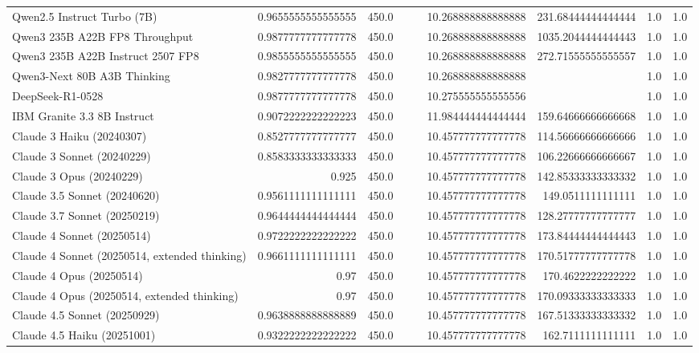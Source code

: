 \begin{table}[htp]
{\begin{tabular}{lrrrrrrrr}
Qwen2.5 Instruct Turbo (7B) & 0.9655555555555555 & 450.0 &  &  & 10.268888888888888 & 231.68444444444444 & 1.0 & 1.0 \\
Qwen3 235B A22B FP8 Throughput & 0.9877777777777778 & 450.0 &  &  & 10.268888888888888 & 1035.2044444444443 & 1.0 & 1.0 \\
Qwen3 235B A22B Instruct 2507 FP8 & 0.9855555555555555 & 450.0 &  &  & 10.268888888888888 & 272.71555555555557 & 1.0 & 1.0 \\
Qwen3-Next 80B A3B Thinking & 0.9827777777777778 & 450.0 &  &  & 10.268888888888888 &  & 1.0 & 1.0 \\
DeepSeek-R1-0528 & 0.9877777777777778 & 450.0 &  &  & 10.275555555555556 &  & 1.0 & 1.0 \\
IBM Granite 3.3 8B Instruct & 0.9072222222222223 & 450.0 &  &  & 11.984444444444444 & 159.64666666666668 & 1.0 & 1.0 \\
Claude 3 Haiku (20240307) & 0.8527777777777777 & 450.0 &  &  & 10.457777777777778 & 114.56666666666666 & 1.0 & 1.0 \\
Claude 3 Sonnet (20240229) & 0.8583333333333333 & 450.0 &  &  & 10.457777777777778 & 106.22666666666667 & 1.0 & 1.0 \\
Claude 3 Opus (20240229) & 0.925 & 450.0 &  &  & 10.457777777777778 & 142.85333333333332 & 1.0 & 1.0 \\
Claude 3.5 Sonnet (20240620) & 0.9561111111111111 & 450.0 &  &  & 10.457777777777778 & 149.0511111111111 & 1.0 & 1.0 \\
Claude 3.7 Sonnet (20250219) & 0.9644444444444444 & 450.0 &  &  & 10.457777777777778 & 128.27777777777777 & 1.0 & 1.0 \\
Claude 4 Sonnet (20250514) & 0.9722222222222222 & 450.0 &  &  & 10.457777777777778 & 173.84444444444443 & 1.0 & 1.0 \\
Claude 4 Sonnet (20250514, extended thinking) & 0.9661111111111111 & 450.0 &  &  & 10.457777777777778 & 170.51777777777778 & 1.0 & 1.0 \\
Claude 4 Opus (20250514) & 0.97 & 450.0 &  &  & 10.457777777777778 & 170.4622222222222 & 1.0 & 1.0 \\
Claude 4 Opus (20250514, extended thinking) & 0.97 & 450.0 &  &  & 10.457777777777778 & 170.09333333333333 & 1.0 & 1.0 \\
Claude 4.5 Sonnet (20250929) & 0.9638888888888889 & 450.0 &  &  & 10.457777777777778 & 167.51333333333332 & 1.0 & 1.0 \\
Claude 4.5 Haiku (20251001) & 0.9322222222222222 & 450.0 &  &  & 10.457777777777778 & 162.7111111111111 & 1.0 & 1.0 \\

\end{tabular}}
\end{table}
